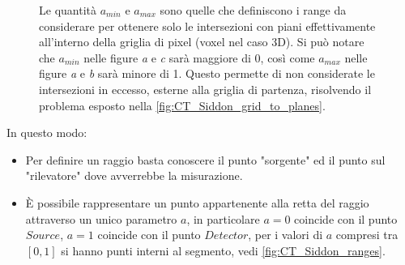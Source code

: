 \documentclass[12pt,a4paper]{report}
\newcounter{figcounter} %
\begin{document}
\begin{figure}[H]
{
  }
  \caption{\label{fig:CT_Siddon_ranges} Le quantità \(a_{min}\) e \(a_{max}\) sono quelle che definiscono i range da considerare
           per ottenere solo le intersezioni con piani effettivamente all'interno della griglia di pixel (voxel nel caso 3D).
           Si può notare che \(a_{min}\) nelle figure \textit{a} e \textit{c} sarà maggiore di 0, così come \(a_{max}\) nelle
           figure \textit{a} e \textit{b} sarà minore di 1.
           Questo permette di non considerate le intersezioni in eccesso, esterne alla griglia di partenza, risolvendo il
           problema esposto nella \autoref{fig:CT_Siddon_grid_to_planes}.}
\end{figure}

In questo modo:
\begin{itemize}
  \item Per definire un raggio basta conoscere il punto "sorgente" ed il punto sul "rilevatore" dove avverrebbe la misurazione.
  \item È possibile rappresentare un punto appartenente alla retta del raggio attraverso un unico parametro \(a\), in particolare
        \(a = 0\) coincide con il punto \(Source\), \(a = 1\) coincide con il punto \(Detector\), per i valori di \(a\) compresi
        tra \([0, 1]\) si hanno punti interni al segmento, vedi \autoref{fig:CT_Siddon_ranges}.
\end{itemize}
\end{document}
